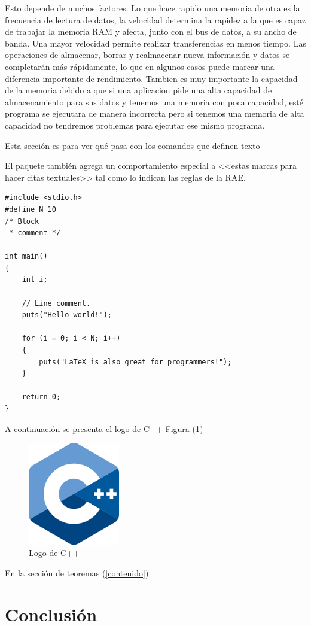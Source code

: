 \documentclass{article}
\begin{document}
Esto depende de muchos factores.
Lo que hace rapido una memoria de otra es la frecuencia de lectura de datos, la velocidad determina la rapidez a la que es capaz de trabajar la memoria RAM y afecta, junto con el bus de datos, a su ancho de banda. Una mayor velocidad permite realizar transferencias en menos tiempo. Las operaciones de almacenar, borrar y realmacenar nueva información y datos se completarán más rápidamente, lo que en algunos casos puede marcar una diferencia importante de rendimiento. Tambien es muy importante la capacidad de la memoria debido a que si una aplicacion pide una alta capacidad de almacenamiento para sus datos y tenemos una memoria con poca capacidad, esté programa se ejecutara de manera incorrecta pero si tenemos una memoria de alta capacidad no tendremos problemas para ejecutar ese mismo programa.



Esta sección es para ver qué pasa con los comandos 
que definen texto

El paquete también agrega un comportamiento especial 
a <<estas marcas para hacer citas textuales>> tal como 
lo indican las reglas de la RAE. \cite{dirac}

\begin{lstlisting}
#include <stdio.h>
#define N 10
/* Block
 * comment */

int main()
{
    int i;

    // Line comment.
    puts("Hello world!");
    
    for (i = 0; i < N; i++)
    {
        puts("LaTeX is also great for programmers!");
    }

    return 0;
}
\end{lstlisting}

A continuación se presenta el logo de C++ Figura (\ref{fig:cpplogo})

\begin{figure}[h]
\includegraphics[width=4cm]{cpplogo.png}
\centering
\caption{Logo de C++}
\label{fig:cpplogo}
\end{figure}

En la sección de teoremas (\ref{contenido})

\section{Conclusión} \label{conclulsion}



\end{document}
